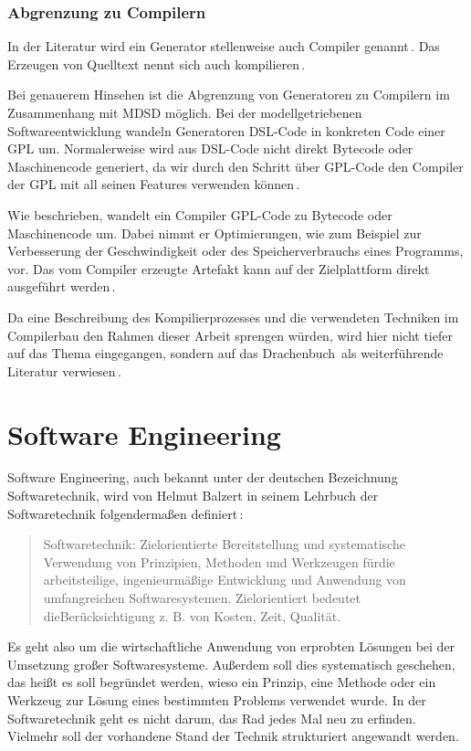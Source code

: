 \documentclass[12pt,oneside,a4paper,parskip]{scrbook}
\begin{document}
\subsubsection{Abgrenzung zu Compilern}

In der Literatur wird ein Generator stellenweise auch Compiler genannt\,\cite[S. 26]{voelter2013}. Das Erzeugen von Quelltext nennt sich auch kompilieren\,\cite[S. 19]{fowler2010}.

Bei genauerem Hinsehen ist die Abgrenzung von Generatoren zu Compilern im Zusammenhang mit MDSD möglich. Bei der modellgetriebenen Softwareentwicklung wandeln Generatoren DSL-Code in konkreten Code einer GPL um. Normalerweise wird aus DSL-Code nicht direkt Bytecode oder Maschinencode generiert, da wir durch den Schritt über GPL-Code den Compiler der GPL mit all seinen Features verwenden können\,\cite[S. 11]{voelter2013}.

Wie beschrieben, wandelt ein Compiler GPL-Code zu Bytecode oder Maschinencode um. Dabei nimmt er Optimierungen, wie zum Beispiel zur Verbesserung der Geschwindigkeit oder des Speicherverbrauchs eines Programms, vor. Das vom Compiler erzeugte Artefakt kann auf der Zielplattform direkt ausgeführt werden\,\cite[S. 345ff.]{czaeis2000}.

Da eine Beschreibung des Kompilierprozesses und die verwendeten Techniken im Compilerbau den Rahmen dieser Arbeit sprengen würden, wird hier nicht tiefer auf das Thema eingegangen, sondern auf das \glqq Drachenbuch\grqq\ als weiterführende Literatur verwiesen\,\cite{aho2006}.

\section{Software Engineering}

Software Engineering, auch bekannt unter der deutschen Bezeichnung Softwaretechnik, wird von Helmut Balzert in seinem Lehrbuch der Softwaretechnik folgendermaßen definiert\,\cite[S.17]{balzert2009a}:

\begin{quote}
Softwaretechnik: Zielorientierte Bereitstellung und systematische Verwendung von Prinzipien, Methoden und Werkzeugen fürdie arbeitsteilige, ingenieurmäßige Entwicklung und Anwendung von umfangreichen Softwaresystemen. Zielorientiert bedeutet dieBerücksichtigung z. B. von Kosten, Zeit, Qualität.
\end{quote}

Es geht also um die wirtschaftliche Anwendung von erprobten Lösungen bei der Umsetzung großer Softwaresysteme. Außerdem soll dies systematisch geschehen, das heißt es soll begründet werden, wieso ein Prinzip, eine Methode oder ein Werkzeug zur Lösung eines bestimmten Problems verwendet wurde. In der Softwaretechnik geht es nicht darum, das Rad jedes Mal neu zu erfinden. Vielmehr soll der vorhandene Stand der Technik strukturiert angewandt werden.
\end{document}
